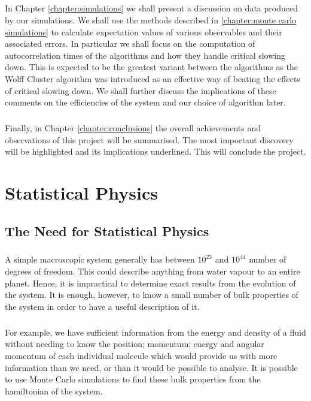 \documentclass[12pt] {report} %
\begin{document}
		\paragraph{}
			In Chapter \ref{chapter:simulations} we shall present a discussion on data produced by our simulations. We shall use the methods described in \ref{chapter:monte carlo simulations} to calculate expectation values of various observables and their associated errors. In particular we shall focus on the computation of autocorrelation times of the algorithms and how they handle critical slowing down. This is expected to be the greatest variant between the algorithms as the Wolff Cluster algorithm was introduced as an effective way of beating the effects of critical slowing down. We shall further discuss the implications of these comments on the efficiencies of the system and our choice of algorithm later.
		\paragraph{}
			Finally, in Chapter \ref{chapter:conclusions} the overall achievements and observations of this project will be summarised. The most important discovery will be highlighted and its implications underlined. This will conclude the project.
			
	
	\chapter{Statistical Physics} \label{chapter:statistical physics}
	
		\section{The Need for Statistical Physics}  \label{sec:basic_statistical_physics}
		
			\paragraph{}
				A simple macroscopic system generally has between $10^{23}$ and $10^{44}$ number of degrees of freedom. This could describe anything from water vapour to an entire planet. Hence, it is impractical to determine exact results from the evolution of the system. It is enough, however, to know a small number of bulk properties of the system in order to have a useful description of it.
			\paragraph{}	
				For example, we have sufficient information from the energy and density of a fluid without needing to know the position; momentum; energy and angular momentum of each individual molecule which would provide us with more information than we need, or than it would be possible to analyse. It is possible to use Monte Carlo simulations to find these bulk properties from the hamiltonian of the system.
\end{document}
